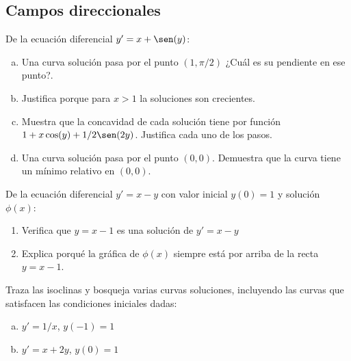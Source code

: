 \documentclass[12pt]{exam}
\begin{document}
    
    \begin{questions}
    
     \section{Campos direccionales}
    
     \question%
     De la ecuación diferencial $y'=x+\sen(y)$:
     \begin{enumerate}[a)]
         \item Una curva solución pasa por el punto $(1,\pi/2)$ ¿Cuál es su pendiente en ese punto?.
         \item Justifica porque para $x>1$ la soluciones son crecientes.
         \item Muestra que la concavidad de cada solución tiene por función $1+x\cos(y)+1/2\sen(2y)$. Justifica cada uno de los pasos.
         \item Una curva solución pasa por el punto $(0,0)$. Demuestra que la curva tiene un mínimo relativo en $(0,0)$.
     \end{enumerate}
    
     \question%
     De la ecuación diferencial $y'=x-y$ con valor inicial $y(0)=1$ y solución $\phi(x)$:
     \begin{enumerate}
         \item Verifica que $y=x-1$ es una solución de $y'=x-y$
         \item Explica porqué la gráfica de $\phi(x)$ siempre está por arriba de la recta $y=x-1$.
     \end{enumerate}
     
     \question%
     Traza las isoclinas y bosqueja varias curvas soluciones, incluyendo las curvas que satisfacen las condiciones iniciales dadas:
     \begin{enumerate}[a)]
         \item  $y'=1/x$, $y(-1)=1$
         \item  $y'=x+2y$, $y(0)=1$
     \end{enumerate}
        

\end{questions}
\end{document}
